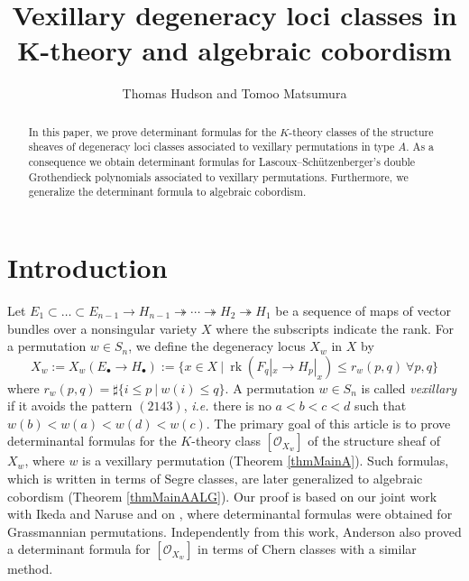 \documentclass[12pt, reqno,sumlimits]{amsart}
\theoremstyle{definition}
\numberwithin{equation}{section}
\newcommand{\scO}{{\mathscr O}}
\newcommand{\surj}{\twoheadrightarrow}
\newcommand{\rk}{{\operatorname{rk}}}
\begin{document}
 
\title{Vexillary degeneracy loci classes in K-theory and algebraic cobordism}
\author{Thomas Hudson and Tomoo Matsumura}
\date{} 
\maketitle 
\begin{abstract}
In this paper, we prove determinant formulas for the $K$-theory classes of the structure sheaves of degeneracy loci classes associated to vexillary permutations in type $A$. As a consequence we obtain determinant formulas for Lascoux--Sch{\"u}tzenberger's double Grothendieck polynomials associated to vexillary permutations. Furthermore, we generalize the determinant formula to algebraic cobordism. 
\end{abstract}
\section{Introduction}
Let $E_1 \subset \dots \subset E_{n-1} \to H_{n-1} \surj \cdots \surj H_2 \surj H_1$ be a sequence of maps of vector bundles over a nonsingular variety $X$ where the subscripts indicate the rank. For a permutation $w\in S_{n}$, we define the degeneracy locus $X_w$ in $X$ by
\[
X_w:=X_w(E_{\bullet} \to H_{\bullet}) := \{ x \in X \ |\ \rk(F_q|_x \to H_p|_x) \leq r_w(p,q) \ \forall p,q\}
\]
where $r_w(p,q)=\sharp\{i \leq p \ |\ w(i)\leq q\}$. 
A permutation $w \in S_n$ is called \emph{vexillary} if it avoids the pattern $(2143)$, \textit{i.e.} there is no $a<b<c<d$ such that $w(b)<w(a)<w(d)<w(c)$. The primary goal of this article is to prove determinantal formulas for the $K$-theory class $[\scO_{X_w}]$ of the structure sheaf of $X_w$, where $w$ is a vexillary permutation (Theorem \ref{thmMainA}). Such formulas, which is written in terms of Segre classes, are later generalized to algebraic cobordism (Theorem \ref{thmMainAALG}). Our proof is based on our joint work \cite{HIMN} with Ikeda and Naruse and on \cite{HudsonMatsumura}, where determinantal formulas were obtained for Grassmannian permutations. Independently from this work, Anderson \cite{Anderson2016} also proved a determinant formula for $[\scO_{X_w}]$ in terms of Chern classes with a similar method. 
\end{document}
